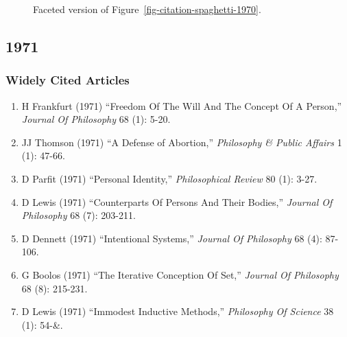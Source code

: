 \documentclass[
  10pt,
  letterpaper,
  DIV=11,
  numbers=noendperiod,
  twoside]{scrartcl}
\providecommand{\tightlist}{%
  \setlength{\itemsep}{0pt}\setlength{\parskip}{0pt}}\usepackage{longtable,booktabs,array}
\begin{document}
\begin{figure}


\caption{\label{fig-citation-facet-1970}Faceted version of
Figure~\ref{fig-citation-spaghetti-1970}.}

\end{figure}%

\newpage

\subsection{1971}\label{sec-s1971}

\subsubsection*{Widely Cited Articles}\label{widely-cited-articles-15}

\begin{enumerate}
\def\labelenumi{\arabic{enumi}.}
\tightlist
\item
  H Frankfurt (1971) ``Freedom Of The Will And The Concept Of A
  Person,'' \emph{Journal Of Philosophy} 68 (1): 5-20.
\item
  JJ Thomson (1971) ``A Defense of Abortion,'' \emph{Philosophy \&
  Public Affairs} 1 (1): 47-66.
\item
  D Parfit (1971) ``Personal Identity,'' \emph{Philosophical Review} 80
  (1): 3-27.
\item
  D Lewis (1971) ``Counterparts Of Persons And Their Bodies,''
  \emph{Journal Of Philosophy} 68 (7): 203-211.
\item
  D Dennett (1971) ``Intentional Systems,'' \emph{Journal Of Philosophy}
  68 (4): 87-106.
\item
  G Boolos (1971) ``The Iterative Conception Of Set,'' \emph{Journal Of
  Philosophy} 68 (8): 215-231.
\item
  D Lewis (1971) ``Immodest Inductive Methods,'' \emph{Philosophy Of
  Science} 38 (1): 54-\&.
\end{enumerate}
\end{document}
